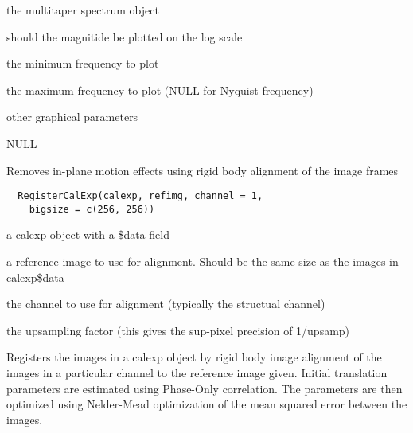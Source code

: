 \documentclass[a4paper]{book}
\begin{document}
%
\begin{Arguments}
\begin{ldescription}
\item[\code{spect}] the multitaper spectrum object

\item[\code{maglog}] should the magnitide be plotted on the log
scale

\item[\code{minfreq}] the minimum frequency to plot

\item[\code{maxfreq}] the maximum frequency to plot (NULL for
Nyquist frequency)

\item[\code{...}] other graphical parameters
\end{ldescription}
\end{Arguments}
%
\begin{Value}
NULL
\end{Value}
%
\begin{Description}\relax
Removes in-plane motion effects using rigid body
alignment of the image frames
\end{Description}
%
\begin{Usage}
\begin{verbatim}
  RegisterCalExp(calexp, refimg, channel = 1,
    bigsize = c(256, 256))
\end{verbatim}
\end{Usage}
%
\begin{Arguments}
\begin{ldescription}
\item[\code{calexp}] a calexp object with a \bsl{}\$data field

\item[\code{refimg}] a reference image to use for alignment.
Should be the same size as the images in calexp\bsl{}\$data

\item[\code{channel}] the channel to use for alignment
(typically the structual channel)

\item[\code{upsamp}] the upsampling factor (this gives the
sup-pixel precision of 1/upsamp)
\end{ldescription}
\end{Arguments}
%
\begin{Details}\relax
Registers the images in a calexp object by rigid body
image alignment of the images in a particular channel to
the reference image given.  Initial translation
parameters are estimated using Phase-Only correlation.
The parameters are then optimized using Nelder-Mead
optimization of the mean squared error between the
images.
\end{Details}
\end{document}

